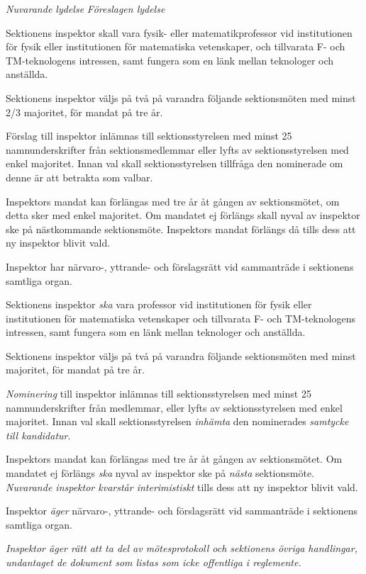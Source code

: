 \documentclass{article}
\newenvironment{lydelse}
    {\begin{paracol}{2}%
        \emph{Nuvarande lydelse}%
        \switchcolumn%
        \emph{Föreslagen lydelse}%
    \end{paracol}%
    \begin{enumerate}[label=\thesubsection.\arabic*]%
    \begin{paracol}{2}%
    }{\end{paracol}\end{enumerate}}
\newcommand{\itemb}{\item[\textbullet]}
\begin{document}
\begin{lydelse}
    \itemb Sektionens inspektor skall vara fysik- eller matematikprofessor vid institutionen för fysik eller institutionen för matematiska vetenskaper, och tillvarata F- och TM-teknologens intressen, samt fungera som en länk mellan teknologer och anställda.
	
	\itemb Sektionens inspektor väljs på två på varandra följande sektionsmöten med minst 2/3 majoritet, för mandat på tre år. 
	
	\itemb Förslag till inspektor inlämnas till sektionsstyrelsen med minst 25 namnunderskrifter från sektionsmedlemmar eller lyfts av sektionsstyrelsen med enkel majoritet. Innan val skall sektionsstyrelsen tillfråga den nominerade om denne är att betrakta som valbar.
	
    \itemb Inspektors mandat kan förlängas med tre år åt gången av sektionsmötet, om detta sker med enkel majoritet. Om mandatet ej förlängs skall nyval av inspektor ske på nästkommande sektionsmöte. Inspektors mandat förlängs då tills dess att ny inspektor blivit vald.

    \itemb Inspektor har närvaro-, yttrande- och förslagsrätt vid sammanträde i sektionens samtliga organ.
    
  \switchcolumn
  \setcounter{enumi}{0}
    
    \item Sektionens inspektor \emph{ska} vara professor vid institutionen för fysik eller institutionen för matematiska vetenskaper och tillvarata F- och TM-teknologens intressen, samt fungera som en länk mellan teknologer och anställda.
	
	\item Sektionens inspektor väljs på två på varandra följande sektionsmöten med minst  majoritet, för mandat på tre år. 
	
	\item \emph{Nominering} till inspektor inlämnas till sektionsstyrelsen med minst 25 namnunderskrifter från medlemmar, eller lyfts av sektionsstyrelsen med enkel majoritet.
    Innan val skall sektionsstyrelsen \emph{inhämta} den nominerades \emph{samtycke till kandidatur}.
	
	\item Inspektors mandat kan förlängas med tre år åt gången av sektionsmötet.
    Om mandatet ej förlängs \emph{ska} nyval av inspektor ske på \emph{nästa} sektionsmöte.
	\emph{Nuvarande inspektor kvarstår interimistiskt} tills dess att ny inspektor blivit vald.

    \item Inspektor \emph{äger} närvaro-, yttrande- och förslagsrätt vid sammanträde i sektionens samtliga organ.
    
    \item \emph{Inspektor äger rätt att ta del av mötesprotokoll och sektionens övriga handlingar, undantaget de dokument som listas som icke offentliga i reglemente.}
\end{lydelse}
\end{document}

